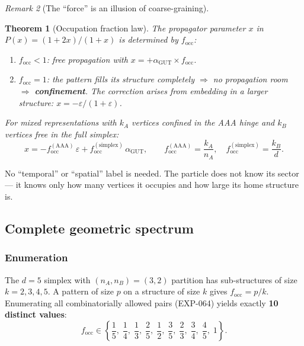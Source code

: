 \documentclass[12pt]{article}
\newtheorem{theorem}{Theorem}[section]
\theoremstyle{remark}
\newtheorem{remark}[theorem]{Remark}
\theoremstyle{definition}
\newcommand{\agut}{\alpha_{\mathrm{GUT}}}
\begin{document}
\begin{remark}[The ``force'' is an illusion of coarse-graining]
\begin{theorem}[Occupation fraction law]
\label{thm:f_occ_main}
The propagator parameter $x$ in $P(x) = (1+2x)/(1+x)$ is determined by $f_\mathrm{occ}$:
\begin{enumerate}
\item $f_\mathrm{occ} < 1$: free propagation with $x = +\agut \times f_\mathrm{occ}$.
\item $f_\mathrm{occ} = 1$: the pattern fills its structure completely $\Rightarrow$ no propagation room $\Rightarrow$ \textbf{confinement}.  The correction arises from embedding in a larger structure: $x = -\varepsilon/(1+\varepsilon)$.
\end{enumerate}
For mixed representations with $k_A$ vertices confined in the AAA hinge and $k_B$ vertices free in the full simplex:
\begin{equation}
x = -f_\mathrm{occ}^\mathrm{(AAA)}\,\varepsilon + f_\mathrm{occ}^\mathrm{(simplex)}\,\agut, \qquad f_\mathrm{occ}^\mathrm{(AAA)} = \frac{k_A}{n_A}, \quad f_\mathrm{occ}^\mathrm{(simplex)} = \frac{k_B}{d}.
\end{equation}
\end{theorem}

No ``temporal'' or ``spatial'' label is needed.  The particle does not know its sector --- it knows only how many vertices it occupies and how large its home structure is.

\subsection{Complete geometric spectrum}
\label{sec:spectrum}

\subsubsection{Enumeration}

The $d = 5$ simplex with $(n_A, n_B) = (3,2)$ partition has sub-structures of size $k = 2, 3, 4, 5$.  A pattern of size $p$ on a structure of size $k$ gives $f_\mathrm{occ} = p/k$.  Enumerating all combinatorially allowed pairs (EXP-064) yields exactly \textbf{10 distinct values}:
\begin{equation}
f_\mathrm{occ} \in \left\{\frac{1}{5},\;\frac{1}{4},\;\frac{1}{3},\;\frac{2}{5},\;\frac{1}{2},\;\frac{3}{5},\;\frac{2}{3},\;\frac{3}{4},\;\frac{4}{5},\;1\right\}.
\end{equation}


\end{remark}
\end{document}
